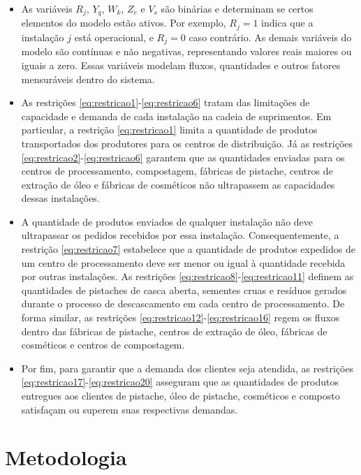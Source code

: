 \documentclass[conference]{IEEEtran}
\begin{document}
\begin{itemize}
  \item As variáveis $R_j$, $Y_q$, $W_k$, $Z_e$ e $V_s$ são binárias e determinam se certos elementos do modelo estão ativos. Por exemplo, $R_j = 1$ indica que a instalação $j$ está operacional, e $R_j = 0$ caso contrário. As demais variáveis do modelo são contínuas e não negativas, representando valores reais maiores ou iguais a zero. Essas variáveis modelam fluxos, quantidades e outros fatores mensuráveis dentro do sistema.
  
  \item As restrições \eqref{eq:restricao1}-\eqref{eq:restricao6} tratam das limitações de capacidade e demanda de cada instalação na cadeia de suprimentos. Em particular, a restrição \eqref{eq:restricao1} limita a quantidade de produtos transportados dos produtores para os centros de distribuição. Já as restrições \eqref{eq:restricao2}-\eqref{eq:restricao6} garantem que as quantidades enviadas para os centros de processamento, compostagem, fábricas de pistache, centros de extração de óleo e fábricas de cosméticos não ultrapassem as capacidades dessas instalações.
  
  \item A quantidade de produtos enviados de qualquer instalação não deve ultrapassar os pedidos recebidos por essa instalação. Consequentemente, a restrição \eqref{eq:restricao7} estabelece que a quantidade de produtos expedidos de um centro de processamento deve ser menor ou igual à quantidade recebida por outras instalações. As restrições \eqref{eq:restricao8}-\eqref{eq:restricao11} definem as quantidades de pistaches de casca aberta, sementes cruas e resíduos gerados durante o processo de descascamento em cada centro de processamento. De forma similar, as restrições \eqref{eq:restricao12}-\eqref{eq:restricao16} regem os fluxos dentro das fábricas de pistache, centros de extração de óleo, fábricas de cosméticos e centros de compostagem.  
  
  \item Por fim, para garantir que a demanda dos clientes seja atendida, as restrições \eqref{eq:restricao17}-\eqref{eq:restricao20} asseguram que as quantidades de produtos entregues aos clientes de pistache, óleo de pistache, cosméticos e composto satisfaçam ou superem suas respectivas demandas.
\end{itemize}

\section{Metodologia}
\label{sec:heuristic1}
\end{document}
